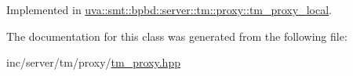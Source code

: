 Implemented in \hyperlink{classuva_1_1smt_1_1bpbd_1_1server_1_1tm_1_1proxy_1_1tm__proxy__local_af91a15abfca464b58f7e752ebc258364}{uva\+::smt\+::bpbd\+::server\+::tm\+::proxy\+::tm\+\_\+proxy\+\_\+local}.



The documentation for this class was generated from the following file\+:\begin{DoxyCompactItemize}
\item 
inc/server/tm/proxy/\hyperlink{tm__proxy_8hpp}{tm\+\_\+proxy.\+hpp}\end{DoxyCompactItemize}
